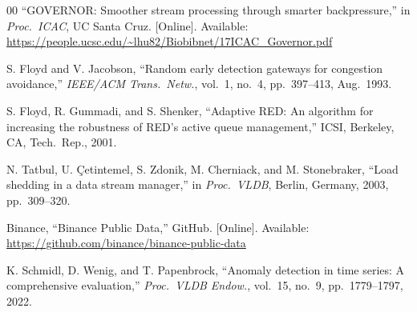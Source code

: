 \documentclass[conference]{IEEEtran}
\begin{document}
\begin{thebibliography}{00}
 ``GOVERNOR: Smoother stream processing through smarter
  backpressure,'' in \emph{Proc.\ ICAC}, UC Santa Cruz. [Online]. Available:
  \url{https://people.ucsc.edu/~lhu82/Biobibnet/17ICAC_Governor.pdf}

 S. Floyd and V. Jacobson, ``Random early detection gateways for
  congestion avoidance,'' \emph{IEEE/ACM Trans.\ Netw.}, vol.~1, no.~4,
  pp.~397--413, Aug.\ 1993.

 S. Floyd, R. Gummadi, and S. Shenker, ``Adaptive RED: An
  algorithm for increasing the robustness of RED's active queue management,''
  ICSI, Berkeley, CA, Tech.\ Rep., 2001.

 N. Tatbul, U. \c{C}etintemel, S. Zdonik,
  M. Cherniack, and M. Stonebraker, ``Load shedding in a data stream
  manager,'' in \emph{Proc.\ VLDB}, Berlin, Germany, 2003, pp.~309--320.

 Binance, ``Binance Public Data,'' GitHub. [Online].
  Available: \url{https://github.com/binance/binance-public-data}

 K. Schmidl, D. Wenig, and T. Papenbrock, ``Anomaly
  detection in time series: A comprehensive evaluation,'' \emph{Proc.\ VLDB
  Endow.}, vol.~15, no.~9, pp.~1779--1797, 2022.
\end{thebibliography}
\end{document}
